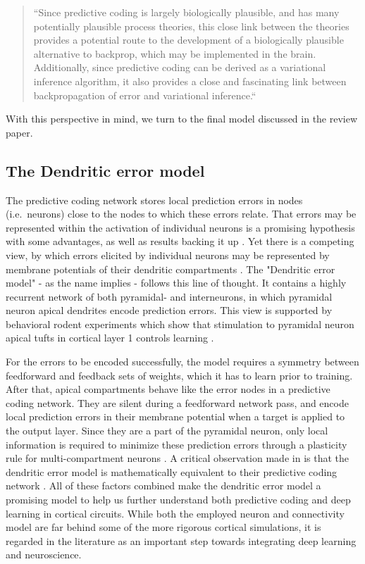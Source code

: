 \begin{quotation}
  \noindent``Since predictive coding is largely biologically plausible, and has many potentially plausible process
  theories, this close link between the theories provides a potential route to the development of a biologically
  plausible alternative to backprop, which may be implemented in the brain. Additionally, since predictive coding can be
  derived as a variational inference algorithm, it also provides a close and fascinating link between backpropagation of
  error and variational inference.`` \citep{millidge2021predictive} \end{quotation}

\noindent With this perspective in mind, we turn to the final model discussed in the review paper.

\subsection{The Dendritic error model}

The predictive coding network stores local prediction errors in nodes (i.e.\ neurons) close to the nodes to which these
errors relate. That errors may be represented within the activation of individual neurons is a promising hypothesis with
some advantages, as well as results backing it up \citep{Hertaeg2022}. Yet there is a competing view, by which errors
elicited by individual neurons may be represented by membrane potentials of their dendritic compartments
\citep{guerguiev2017towards}. The "Dendritic error model" \citep{sacramento2018dendritic} - as the name implies -
follows this line of thought. It contains a highly recurrent network of both pyramidal- and interneurons, in which
pyramidal neuron apical dendrites encode prediction errors. This view is supported by behavioral rodent experiments
which show that stimulation to pyramidal neuron apical tufts in cortical layer 1 controls learning \citep{Doron2020}.

For the errors to be encoded successfully, the model requires a symmetry between feedforward and feedback sets of
weights, which it has to learn prior to training. After that, apical compartments behave like the error nodes in a
predictive coding network. They are silent during a feedforward network pass, and encode local prediction errors in
their membrane potential when a target is applied to the output layer. Since they are a part of the pyramidal neuron,
only local information is required to minimize these prediction errors through a plasticity rule for multi-compartment
neurons \citep{urbanczik2014learning}. A critical observation made in \citep{whittington2019theories} is that the
dendritic error model is mathematically equivalent to their predictive coding network . All of these factors combined make the dendritic error model a promising model to help
us further understand both predictive coding and deep learning in cortical circuits. While both the employed neuron and
connectivity model are far behind some of the more rigorous cortical simulations, it is regarded in the
literature as an important step towards integrating deep learning and neuroscience.

